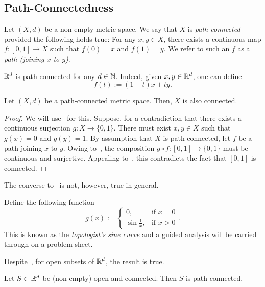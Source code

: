 \subsection{Path-Connectedness}
\label{sec:path_connect}
\begin{defn}
	Let $(X,d)$ be a non-empty metric space. We say that $X$ is \textit{path-connected} provided the following holds true: For any $x,y\in X$, there exists a continuous map $f:[0,1]\to X$ such that $f(0) = x$ and $f(1) = y$. We refer to such an $f$ as a \textit{path (joining $x$ to $y$)}.
\end{defn}
\begin{eg}
	$\mathbb{R}^d$ is path-connected for any $d\in\mathbb{N}$. Indeed, given $x,y\in\mathbb{R}^d$, one can define
	\[
	f(t) := (1-t)x + ty.
	\]
\end{eg}
\begin{prop}
	\label{prop:path_connect_implies_connect}
	Let $(X,d)$ be a path-connected metric space. Then, $X$ is also connected.
\end{prop}
\begin{proof}
	We will use~ for this. Suppose, for a contradiction that there exists a continuous surjection $g:X\to \{0,1\}$. There must exist $x,y\in X$ such that $g(x) = 0$ and $g(y) = 1$. By assumption that $X$ is path-connected, let $f$ be a path joining $x$ to $y$. Owing to~, the composition $g\circ f:[0,1]\to \{0,1\}$ must be continuous and surjective. Appealing to~, this contradicts the fact that $[0,1]$ is connected.
\end{proof}
The converse to~ is not, however, true in general.
\begin{eg}
	\label{eg:top_sine}
	Define the following function
	\[
	g(x):=\left\{
	\begin{array}{cc}
		0, 	&\text{if }x=0 	\\
		\sin \frac{1}{x},	&\text{if }x >0
	\end{array}
	\right..
	\]
	This is known as the \textit{topologist's sine curve} and a guided analysis will be carried through on a problem sheet.
\end{eg}
Despite~, for open subsets of $\mathbb{R}^d$, the result is true.
\begin{thm}
	\label{thm:open_connected_real}
	Let $S\subset \mathbb{R}^d$ be (non-empty) open and connected. Then $S$ is path-connected.
\end{thm}
